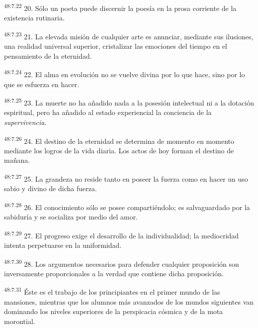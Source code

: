 \par
\textsuperscript{48:7.22} 20. Sólo un poeta puede discernir la poesía en la prosa corriente de la existencia rutinaria.

\par
\textsuperscript{48:7.23} 21. La elevada misión de cualquier arte es anunciar, mediante sus ilusiones, una realidad universal superior, cristalizar las emociones del tiempo en el pensamiento de la eternidad.

\par
\textsuperscript{48:7.24} 22. El alma en evolución no se vuelve divina por lo que hace, sino por lo que se esfuerza en hacer.

\par
\textsuperscript{48:7.25} 23. La muerte no ha añadido nada a la posesión intelectual ni a la dotación espiritual, pero ha añadido al estado experiencial la conciencia de la \textit{supervivencia}.

\par
\textsuperscript{48:7.26} 24. El destino de la eternidad se determina de momento en momento mediante los logros de la vida diaria. Los actos de hoy forman el destino de mañana.

\par
\textsuperscript{48:7.27} 25. La grandeza no reside tanto en poseer la fuerza como en hacer un uso sabio y divino de dicha fuerza.

\par
\textsuperscript{48:7.28} 26. El conocimiento sólo se posee compartiéndolo; es salvaguardado por la sabiduría y se socializa por medio del amor.

\par
\textsuperscript{48:7.29} 27. El progreso exige el desarrollo de la individualidad; la mediocridad intenta perpetuarse en la uniformidad.

\par
\textsuperscript{48:7.30} 28. Los argumentos necesarios para defender cualquier proposición son inversamente proporcionales a la verdad que contiene dicha proposición.

\par
\textsuperscript{48:7.31} Éste es el trabajo de los principiantes en el primer mundo de las mansiones, mientras que los alumnos más avanzados de los mundos siguientes van dominando los niveles superiores de la perspicacia cósmica y de la mota morontial.

